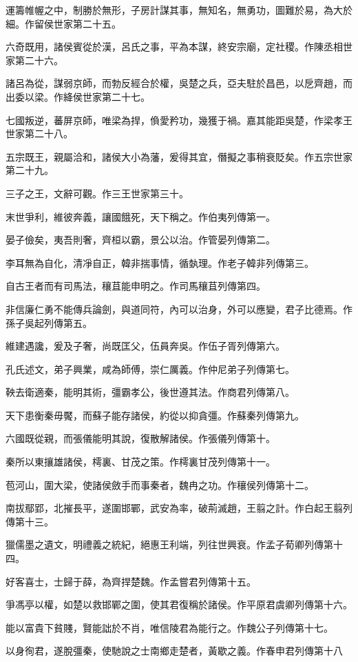 運籌帷幄之中，制勝於無形，子房計謀其事，無知名，無勇功，圖難於易，為大於細。作留侯世家第二十五。

六奇既用，諸侯賓從於漢，呂氏之事，平為本謀，終安宗廟，定社稷。作陳丞相世家第二十六。

諸呂為從，謀弱京師，而勃反經合於權，吳楚之兵，亞夫駐於昌邑，以戹齊趙，而出委以梁。作絳侯世家第二十七。

七國叛逆，蕃屏京師，唯梁為捍，偩愛矜功，幾獲于禍。嘉其能距吳楚，作梁孝王世家第二十八。

五宗既王，親屬洽和，諸侯大小為藩，爰得其宜，僭擬之事稍衰貶矣。作五宗世家第二十九。

三子之王，文辭可觀。作三王世家第三十。

末世爭利，維彼奔義，讓國餓死，天下稱之。作伯夷列傳第一。

晏子儉矣，夷吾則奢，齊桓以霸，景公以治。作管晏列傳第二。

李耳無為自化，清凈自正，韓非揣事情，循埶理。作老子韓非列傳第三。

自古王者而有司馬法，穰苴能申明之。作司馬穰苴列傳第四。

非信廉仁勇不能傳兵論劍，與道同符，內可以治身，外可以應變，君子比德焉。作孫子吳起列傳第五。

維建遇讒，爰及子奢，尚既匡父，伍員奔吳。作伍子胥列傳第六。

孔氏述文，弟子興業，咸為師傅，崇仁厲義。作仲尼弟子列傳第七。

鞅去衛適秦，能明其術，彊霸孝公，後世遵其法。作商君列傳第八。

天下患衡秦毋饜，而蘇子能存諸侯，約從以抑貪彊。作蘇秦列傳第九。

六國既從親，而張儀能明其說，復散解諸侯。作張儀列傳第十。

秦所以東攘雄諸侯，樗裏、甘茂之策。作樗裏甘茂列傳第十一。

苞河山，圍大梁，使諸侯斂手而事秦者，魏冉之功。作穰侯列傳第十二。

南拔鄢郢，北摧長平，遂圍邯鄲，武安為率，破荊滅趙，王翦之計。作白起王翦列傳第十三。

獵儒墨之遺文，明禮義之統紀，絕惠王利端，列往世興衰。作孟子荀卿列傳第十四。

好客喜士，士歸于薛，為齊捍楚魏。作孟嘗君列傳第十五。

爭馮亭以權，如楚以救邯鄲之圍，使其君復稱於諸侯。作平原君虞卿列傳第十六。

能以富貴下貧賤，賢能詘於不肖，唯信陵君為能行之。作魏公子列傳第十七。

以身徇君，遂脫彊秦，使馳說之士南鄉走楚者，黃歇之義。作春申君列傳第十八


